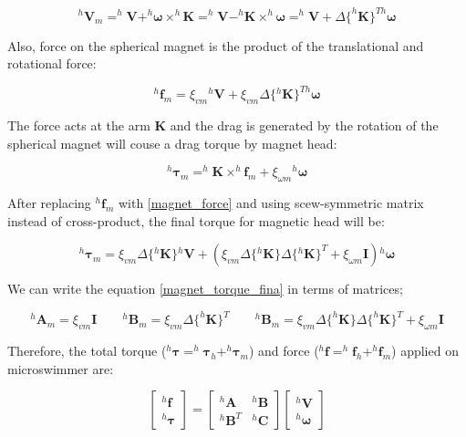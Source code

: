 \documentclass[12pt,a4paper,titlepage]{report}
\begin{document}
\begin{equation}
^{h}\bm V_{m} = ^{h}\bm{V} + ^{h}\bm{\omega} \times ^{h}\bm{ K }= ^{h}\bm {V} - ^{h}\bm{K} \times ^{h}\bm{\omega}
= ^{h}\bm{V} + \Delta \{^{h}\bm{ K} \}^{Th} \bm{\omega}
\label{magnet_velocity}
\end{equation}

Also, force on the spherical magnet is the product of the translational and rotational force:

 
\begin{equation}
^{h}\bm{f}_{m} = \xi_{vm} {^{h}{\bm{V}}} + \xi_{vm} \Delta\{ {^{h}\bm{K}}\}^{Th} \bm{\omega}
\label{magnet_force}
\end{equation}

The force acts at the arm $\bm{K}$ and the drag is generated by the rotation of the spherical magnet will 
couse a drag torque by magnet head:

 \begin{equation}
^{h}\bm{\tau}_{m} = ^{h}\bm{K} \times  ^{h}\bm{f}_{m} + \xi_{\omega m} {^{h}\bm{\omega}}
\label{magnet_head_torque}
\end{equation}

After replacing $^{h}\bm{f}_{m}$ with \ref{magnet_force} and using scew-symmetric matrix instead of
cross-product, the final torque for magnetic head will be:

 

\begin{equation}
^{h}\bm{\tau}_{m} = \xi_{vm}\Delta\{ {^{h}\bm{K}}\} {^{h}{\bm{V}}} + (\xi_{vm} \Delta\{ {^{h}\bm{K}}\}   {\Delta\{ {^{h}\bm{K}}\}}^{T} + \xi_{\omega m}  \bm{I} ){^{h}\bm{\omega}}
\label{magnet_torque_final}
\end{equation}


We can write the equation \ref{magnet_torque_fina} in terms of matrices;


\begin{equation}
^{h}\bm{A}_m = \xi_{vm} \bm{I}  \qquad  ^{h}\bm{B}_m = \xi_{vm} \Delta \{ ^{h}\bm{K} \}^T \qquad
{^{h}\bm{B}_m = \xi_{vm} \Delta \{ ^{h}\bm{K} \} \Delta \{ ^{h}\bm{K} \}^T} + \xi_{\omega m} \bm{ I}
\label{A_m}
\end{equation}

Therefore, the total torque ($^{h}\bm{\tau} =^{h}\bm{\tau}_h +^{h}\bm{\tau}_m$) and force
 ($^{h}\bm{f} =^{h}\bm{f}_h +^{h}\bm{f}_m$) applied on microswimmer are:


\[
\begin{bmatrix} ^{h}\bm{f}\\ 
^{h}\bm{\tau}\end{bmatrix}  = \begin{bmatrix} ^{h}\bm{A} & ^{h}\bm{B}\\ 
^{h}\bm{B}^{T} & ^{h}\bm{C} \end{bmatrix}  \begin{bmatrix} ^{h}\bm{V}
 \\ ^{h}\bm{\omega}
\end{bmatrix}
\]
\end{document}
